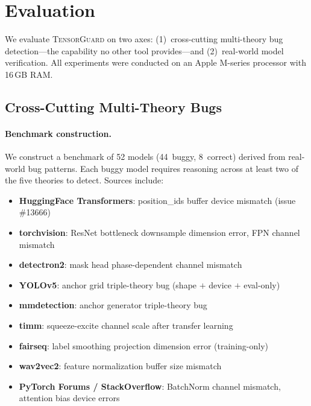 \documentclass[10pt]{article}
\newcommand{\tguard}{\textsc{TensorGuard}}
\theoremstyle{plain}
\theoremstyle{definition}
\theoremstyle{remark}
\begin{document}
\section{Evaluation}\label{sec:eval}

We evaluate \tguard{} on two axes: (1)~cross-cutting multi-theory
bug detection---the capability no other tool provides---and
(2)~real-world model verification.  All experiments were conducted
on an Apple M-series processor with 16\,GB RAM.

\subsection{Cross-Cutting Multi-Theory Bugs}\label{sec:cross-cutting}

\paragraph{Benchmark construction.}
We construct a benchmark of 52 models (44~buggy, 8~correct) derived
from real-world bug patterns.  Each buggy model requires reasoning
across at least two of the five theories to detect.  Sources include:

\begin{itemize}[nosep,leftmargin=1.5em]
  \item \textbf{HuggingFace Transformers}: position\_ids buffer
    device mismatch (issue \#13666)
  \item \textbf{torchvision}: ResNet bottleneck downsample dimension
    error, FPN channel mismatch
  \item \textbf{detectron2}: mask head phase-dependent channel
    mismatch
  \item \textbf{YOLOv5}: anchor grid triple-theory bug (shape $+$
    device $+$ eval-only)
  \item \textbf{mmdetection}: anchor generator triple-theory bug
  \item \textbf{timm}: squeeze-excite channel scale after transfer
    learning
  \item \textbf{fairseq}: label smoothing projection dimension error
    (training-only)
  \item \textbf{wav2vec2}: feature normalization buffer size mismatch
  \item \textbf{PyTorch Forums / StackOverflow}: BatchNorm channel
    mismatch, attention bias device errors
\end{itemize}
\end{document}
